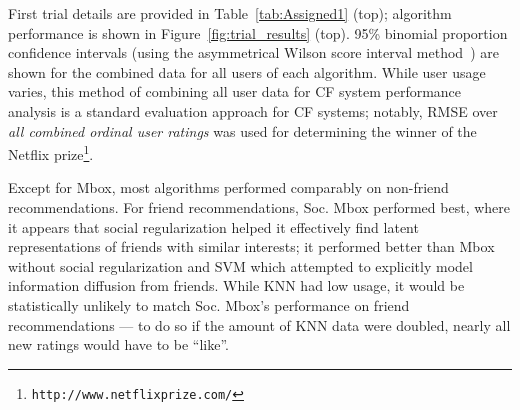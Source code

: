 First trial details are provided in Table~\ref{tab:Assigned1} (top);
algorithm performance is shown in Figure~\ref{fig:trial_results}
(top).  95\% binomial proportion confidence intervals (using the
asymmetrical Wilson score interval method~\cite{wilson_ci}) are shown
for the combined data for all users of each algorithm.  While user
usage varies, this method of combining all user data for CF system
performance analysis is a standard evaluation approach for CF systems;
notably, RMSE over \emph{all combined ordinal user ratings} was used for
determining the winner of the Netflix
prize\footnote{\texttt{http://www.netflixprize.com/}}.

Except for Mbox, most algorithms performed comparably on non-friend
recommendations.  For friend recommendations, 
Soc. Mbox performed best, where it appears that social regularization
helped it effectively find latent representations of friends with
similar interests; it performed better than Mbox without social
regularization and SVM which attempted to explicitly model information
diffusion from friends.  While KNN had low usage, it would be
statistically unlikely to match Soc. Mbox's performance on friend
recommendations --- to do so if the amount of KNN data were doubled,
nearly all new ratings would have to be ``like''.

